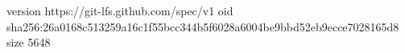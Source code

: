 version https://git-lfs.github.com/spec/v1
oid sha256:26a0168c513259a16c1f55bcc344b5f6028a6004be9bbd52eb9ecce7028165d8
size 5648
